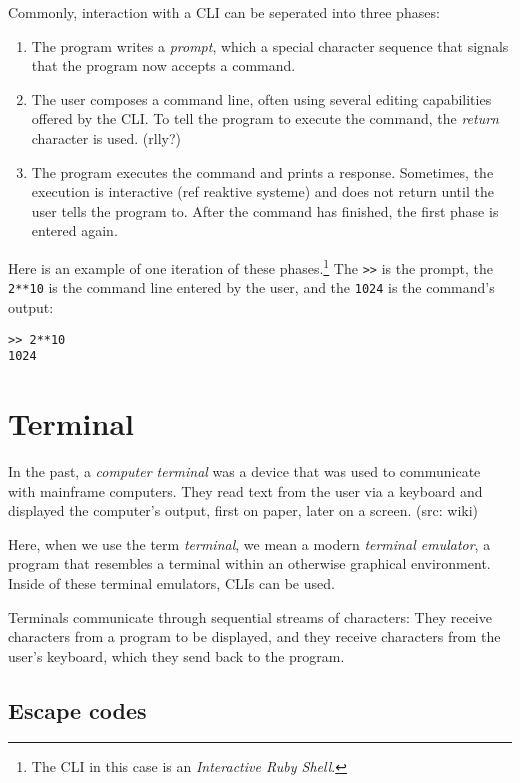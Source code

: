 \documentclass[twoside,blue]{tubsreprt}
\begin{document}
Commonly, interaction with a \textsc{CLI} can be seperated into three phases:

\begin{enumerate}
    \item The program writes a \emph{prompt}, which a special character sequence that signals that the program now accepts a command.
    \item The user composes a command line, often using several editing capabilities offered by the CLI. To tell the program to execute the command, the \emph{return} character is used. (rlly?)
    \item The program executes the command and prints a response. Sometimes, the execution is interactive (ref reaktive systeme) and does not return until the user tells the program to. After the command has finished, the first phase is entered again.
\end{enumerate}

Here is an example of one iteration of these phases.\footnote{The \textsc{CLI} in this case is an \emph{Interactive Ruby Shell}.} The \texttt{>\->} is the prompt, the \texttt{2**10} is the command line entered by the user, and the \texttt{1024} is the command's output:

\begin{lstlisting}
>> 2**10
1024
\end{lstlisting}

\section{Terminal}

In the past, a \emph{computer terminal} was a device that was used to communicate with mainframe computers. They read text from the user via a keyboard and displayed the computer's output, first on paper, later on a screen. (src: wiki)

Here, when we use the term \emph{terminal}, we mean a modern \emph{terminal emulator}, a program that resembles a terminal within an otherwise graphical environment. Inside of these terminal emulators, \textsc{CLI}s can be used.

Terminals communicate through sequential streams of characters: They receive characters from a program to be displayed, and they receive characters from the user's keyboard, which they send back to the program.

\subsection{Escape codes}
\end{document}
